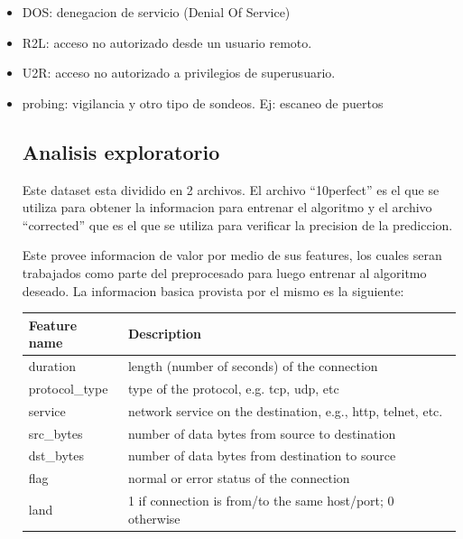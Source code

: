 \documentclass[a4paper,10pt]{article}
\begin{document}
\begin{itemize}
\item DOS:     denegacion de servicio (Denial Of Service)

\item R2L: acceso no autorizado desde un usuario remoto.

\item U2R:  acceso no autorizado a privilegios de superusuario.

\item probing: vigilancia y otro tipo de sondeos. Ej: escaneo de puertos


\subsection{Analisis exploratorio}


Este dataset esta dividido en 2 archivos. El archivo “10perfect” es el que se utiliza para obtener la informacion para entrenar el algoritmo y el archivo “corrected” que es el que se utiliza para verificar la precision de la prediccion.

Este provee informacion de valor por medio de sus features, los cuales seran trabajados como parte del preprocesado para luego entrenar al algoritmo deseado. La informacion basica provista por el mismo es la siguiente:


\begin{center}
\begin{longtable}{|l|l|}

\hline
Feature name & Description  \\
\hline
duration  & length (number of seconds) of the connection   \\
protocol\_type &
type of the protocol, e.g. tcp, udp, etc \\
service 
& network service on the destination, e.g., http, telnet, etc. \\
src\_bytes 
& number of data bytes from source to destination \\

dst\_bytes 
& number of data bytes from destination to source 
\\

flag 
& normal or error status of the connection 
\\

land 
& 1 if connection is from/to the same host/port; 0 otherwise 
\\


\end{longtable}
\end{center}
\end{itemize}
\end{document}
